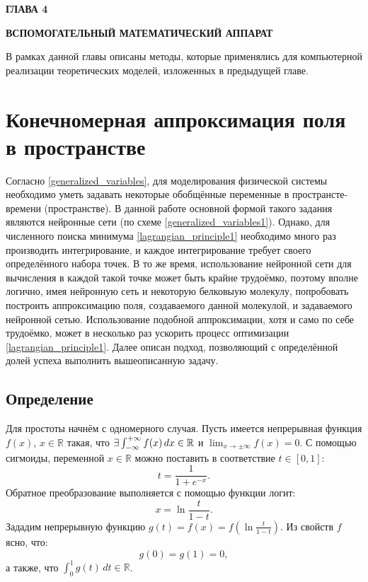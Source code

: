 \newpage
\begin{center}
	\textbf{\large ГЛАВА 4}

	\textbf{\large ВСПОМОГАТЕЛЬНЫЙ МАТЕМАТИЧЕСКИЙ АППАРАТ}
\end{center}

В рамках данной главы описаны методы, которые применялись для компьютерной реализации теоретических моделей, изложенных в предыдущей главе.

\section{Конечномерная аппроксимация поля в пространстве}
Согласно \ref{generalized_variables}, для моделирования физической системы необходимо уметь задавать некоторые обобщённые переменные в пространсте-времени (пространстве). В данной работе основной формой такого задания являются нейронные сети (по схеме \ref{generalized_variables1}). Однако, для численного поиска минимума \ref{lagrangian_principle1} необходимо много раз производить  интегрирование, и каждое интегрирование требует своего определённого набора точек. В то же время, использование нейронной сети для вычисления в каждой такой точке может быть крайне трудоёмко, поэтому вполне логично, имея нейронную сеть и некоторую белковыую молекулу, попробовать построить аппроксимацию поля, создаваемого данной молекулой, и задаваемого нейронной сетью. Использование подобной аппроксимации, хотя и само по себе трудоёмко, может в несколько раз ускорить процесс оптимизации \ref{lagrangian_principle1}. Далее описан подход, позволяющий с определённой долей успеха выполнить вышеописанную задачу. 

\subsection{Определение}
Для простоты начнём с одномерного случая. Пусть имеется непрерывная функция $f(x)$, $x \in \mathbb{R}$ такая, что $\exists \int_{-\infty}^{+\infty} f(x) \, dx \in \mathbb{R}$ и
$\lim_{x \to \pm\infty}f(x) = 0$. С помощью сигмоиды, переменной $x \in \mathbb{R}$ можно поставить в соответствие $t \in [0, 1]$:
\begin{equation}
	t = \frac{1}{1 + e^{-x}}.
	\label{t_and_x}
\end{equation}
Обратное преобразование выполняется с помощью функции логит:
\begin{equation}
	x = \ln\frac{t}{1-t}.
	\label{x_and_t}
\end{equation}
Зададим непрерывную функцию $g(t) = f(x) = f(\ln\frac{t}{1-t})$. Из свойств $f$ ясно, что:
\begin{equation}
	g(0) = g(1) = 0,
	\label{g_zeros}
\end{equation}
а также, что $\int_0^1g(t) \, dt \in \mathbb{R}$.

